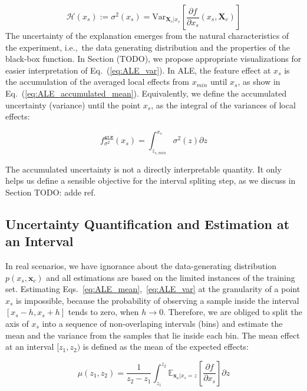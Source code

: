 \documentclass[twoside]{article}
\newcommand{\dfdx}{\frac{\partial f}{\partial x_s}}
\newcommand{\xc}{\mathbf{x_c}}
\newcommand{\Xcb}{\mathbf{X}_c}
\begin{document}
\begin{equation}
  \label{eq:ALE_var}
  \mathcal{H}(x_s) := \sigma^2(x_s) = \mathrm{Var}_{\Xcb|x_s}\left [\dfdx (x_s, \Xcb) \right ]
\end{equation}
\noindent
The uncertainty of the explanation emerges from the natural
characteristics of the experiment, i.e.,~the data generating
distribution and the properties of the black-box function. In Section
(TODO), we propose appropriate visualizations for easier
interpretation of Eq.~(\ref{eq:ALE_var}). In ALE, the feature effect
at \(x_s\) is the accumulation of the averaged local effects from
\(x_{min}\) until \(x_s\), as show in
Eq.~(\ref{eq:ALE_accumulated_mean}). Equivalently, we define the
accumulated uncertainty (variance) until the point \(x_s\), as the
integral of the variances of local effects:

\begin{equation}
  \label{eq:ALE_accumulated_var}
  f^{\mathtt{ALE}}_{\sigma^2}(x_s) = \int_{z_{s, min}}^{x_s} \sigma^2(z) \partial z
\end{equation}
\noindent

The accumulated uncertainty is not a directly interpretable
quantity. It only helps us define a sensible objective for the
interval spliting step, as we discuss in Section TODO: adde ref.

\subsection{Uncertainty Quantification and Estimation at an Interval}

In real scenarios, we have ignorance about the data-generating
distribution \(p(x_s, \mathbf{x}_c)\) and all estimations are based on
the limited instances of the training set. Estimating
Eqs.~\eqref{eq:ALE_mean},~\eqref{eq:ALE_var} at the granularity of a
point \(x_s\) is impossible, because the probability of observing a
sample inside the interval \([x_s - h, x_s + h]\) tends to zero, when
\(h \to 0\). Therefore, we are obliged to split the axis of \(x_s\)
into a sequence of non-overlaping intervals (bins) and estimate the
mean and the variance from the samples that lie inside each bin. The
mean effect at an interval \([z_1, z_2)\) is defined as the mean of
the expected effects:

\begin{equation}
  \label{eq:mu_bin}
  \mu(z_1, z_2) = \frac{1}{z_2 - z_1} \int_{z_1}^{z_2}
  \mathbb{E}_{\xc|x_s=z}\left [\frac{\partial f}{\partial x_s} \right ] \partial z
\end{equation}
\end{document}
